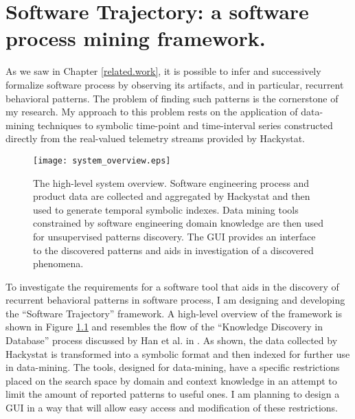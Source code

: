 \chapter{Software Trajectory: a software process mining framework.} \label{trajectory}
As we saw in Chapter \ref{related.work}, it is possible to infer and successively formalize software process by observing its artifacts, and in particular, recurrent behavioral patterns. The problem of finding such patterns is the cornerstone of my research. My approach to this problem rests on the application of data-mining techniques to symbolic time-point and time-interval series constructed directly from the real-valued telemetry streams provided by Hackystat.

\begin{figure}[tbp]
   \centering
   \texttt{[image: system\_overview.eps]}
   \caption{The high-level system overview. Software engineering process and product data are collected and aggregated by Hackystat and then used to generate temporal symbolic indexes. Data mining tools constrained by software engineering domain knowledge are then used for unsupervised patterns discovery. The GUI provides an interface to the discovered patterns and aids in investigation of a discovered phenomena.}
   \label{fig:system_overview}
\end{figure}


To investigate the requirements for a software tool that aids in the discovery of recurrent behavioral patterns in software process, I am designing and developing the ``Software Trajectory'' framework. A high-level overview of the framework is shown in Figure \ref{fig:system_overview} and resembles the flow of the ``Knowledge Discovery in Database'' process discussed by Han et al. in \cite{citeulike:709476}. As shown, the data collected by Hackystat is transformed into a symbolic format and then indexed for further use in data-mining. The tools, designed for data-mining, have a specific restrictions placed on the search space by domain and context knowledge in an attempt to limit the amount of reported patterns to useful ones. I am planning to design a GUI in a way that will allow easy access and modification of these restrictions. 


